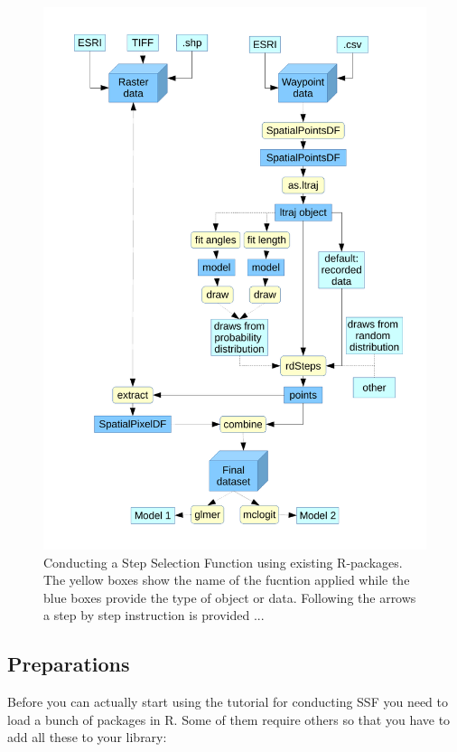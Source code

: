 \documentclass[11pt, a4paper]{article} %
\begin{document}
\begin{figure} %
\captionsetup{width=1\textwidth}
\centering
\includegraphics[width=1\textwidth]{Flowchart.pdf} %
\caption{Conducting a Step Selection Function using existing R-packages. The yellow boxes show the name of the fucntion applied while the blue boxes provide the type of object or data. Following the arrows a step by step instruction is provided ...}
\label{fig:Flowchart}
\end{figure}




\subsection{Preparations}
Before you can actually start using the tutorial for conducting SSF you need to load a bunch of packages in R. Some of them require others so that you have to add all these to your library:
\end{document}
